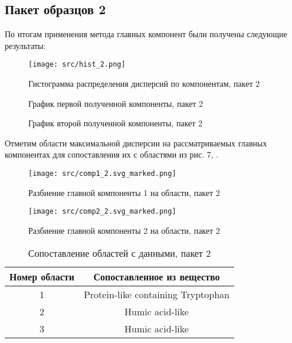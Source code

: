 \documentclass[a4paper]{article}
\begin{document}
\subsection{Пакет образцов 2}
По итогам применения метода главных компонент были получены следующие результаты:
\begin{figure}[H]
    \centering
    \texttt{[image: src/hist\_2.png]}
    \caption{Гистограмма распределения дисперсий по компонентам, пакет 2}
    \label{fig:hist_2}
\end{figure}
\begin{figure}[H]
    \centering
    
    
    \caption{График первой полученной компоненты, пакет 2}
    \label{fig:comp_1_2}
\end{figure}
\begin{figure}[H]
    \centering
    
    
    \caption{График второй полученной компоненты, пакет 2}
    \label{fig:comp_2_2}
\end{figure}
Отметим области максимальной дисперсии на рассматриваемых главных компонентах для сопоставления их с областями из рис. 7, \cite{article1}.
\begin{figure}[H]
    \centering
    \texttt{[image: src/comp1\_2.svg\_marked.png]}
    \caption{Разбиение главной компоненты 1 на области, пакет 2}
    \label{fig:comp1_2_marked}
\end{figure}
\begin{figure}[H]
    \centering
    \texttt{[image: src/comp2\_2.svg\_marked.png]}
    \caption{Разбиение главной компоненты 2 на области, пакет 2}
    \label{fig:comp2_2_marked}
\end{figure}
\begin{table}[H]
    \centering
    \begin{tabular}{|c|c|}
        \hline
        Номер области & Сопоставленное из \cite{article1} вещество\\
        \hline  
        1&Protein-like containing Tryptophan\\
        \hline
        2&Humic acid-like\\
        \hline
        3&Humic acid-like\\
        \hline
    \end{tabular}
    \caption{Сопоставление областей с данными, пакет 2}
    \label{tab:marked_regions_2}
\end{table}
\end{document}
